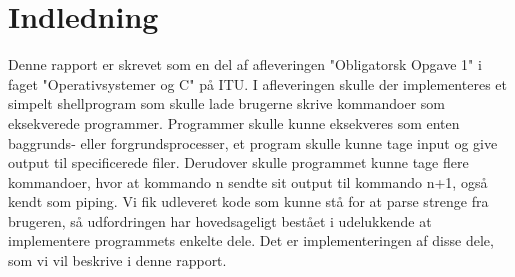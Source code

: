 \section{Indledning}
Denne rapport er skrevet som en del af afleveringen "Obligatorsk Opgave 1" i faget "Operativsystemer og C" på ITU.
I afleveringen skulle der implementeres et simpelt shellprogram som skulle lade brugerne skrive kommandoer som eksekverede programmer.
Programmer skulle kunne eksekveres som enten baggrunds- eller forgrundsprocesser, et program skulle kunne tage input og give output til specificerede filer. Derudover skulle programmet kunne tage flere kommandoer, hvor at kommando n sendte sit output til kommando n+1, også kendt som piping. Vi fik udleveret kode som kunne stå for at parse strenge fra brugeren, så udfordringen har hovedsageligt bestået i udelukkende at implementere programmets enkelte dele. Det er implementeringen af disse dele, som vi vil beskrive i denne rapport.
